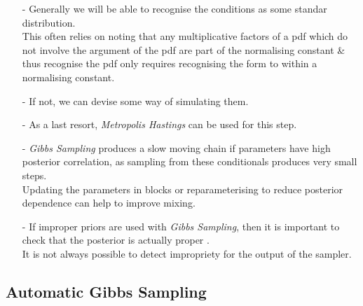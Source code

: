 \documentclass[11pt,a4paper]{article}
\begin{document}
\begin{itemize}
	\item[-] Generally we will be able to recognise the conditions as some standar distribution.\\
	This often relies on noting that any multiplicative factors of a pdf which do not involve the argument of the pdf are part of the normalising constant \& thus recognise the pdf only requires recognising the form to within a normalising constant.
	\item[-] If not, we can devise some way of simulating them.
	\item[-] As a last resort, \textit{Metropolis Hastings} can be used for this step.
\end{itemize}

\begin{itemize}
	\item[-] \textit{Gibbs Sampling} produces a slow moving chain if parameters have high posterior correlation, as sampling from these conditionals produces very small steps.\\
Updating the parameters in blocks or reparameterising to reduce posterior dependence can help to improve mixing.
	\item[-] If improper priors are used with \textit{Gibbs Sampling}, then it is important to check that the posterior is actually proper .\\
	It is not always possible to detect impropriety for the output of the sampler.
\end{itemize}

\subsection{Automatic Gibbs Sampling}
\end{document}
